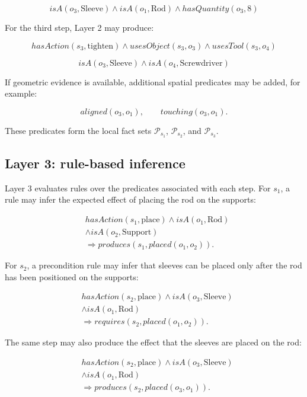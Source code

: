 \[
isA(o_3,\text{Sleeve}) \wedge isA(o_1,\text{Rod}) \wedge hasQuantity(o_3,8)
\]

For the third step, Layer 2 may produce:

\[
hasAction(s_3,\text{tighten}) \wedge usesObject(s_3,o_3) \wedge usesTool(s_3,o_4)
\]

\[
isA(o_3,\text{Sleeve}) \wedge isA(o_4,\text{Screwdriver})
\]

If geometric evidence is available, additional spatial predicates may be added, for example:

\[
aligned(o_3,o_1), \qquad touching(o_3,o_1).
\]

These predicates form the local fact sets $\mathcal{P}_{s_1}$, $\mathcal{P}_{s_2}$, and $\mathcal{P}_{s_3}$.

\subsection{Layer 3: rule-based inference}

Layer 3 evaluates rules over the predicates associated with each step. For $s_1$, a rule may infer the expected effect of placing the rod on the supports:

\[
\begin{aligned}
&hasAction(s_1,\text{place}) \wedge isA(o_1,\text{Rod}) \\
&\wedge isA(o_2,\text{Support}) \\
&\Rightarrow produces(s_1, placed(o_1,o_2)).
\end{aligned}
\]

For $s_2$, a precondition rule may infer that sleeves can be placed only after the rod has been positioned on the supports:

\[
\begin{aligned}
&hasAction(s_2,\text{place}) \wedge isA(o_3,\text{Sleeve}) \\
&\wedge isA(o_1,\text{Rod}) \\
&\Rightarrow requires(s_2, placed(o_1,o_2)).
\end{aligned}
\]


The same step may also produce the effect that the sleeves are placed on the rod:

\[
\begin{aligned}
&hasAction(s_2,\text{place}) \wedge isA(o_3,\text{Sleeve}) \\
&\wedge isA(o_1,\text{Rod}) \\
&\Rightarrow produces(s_2, placed(o_3,o_1)).
\end{aligned}
\]


